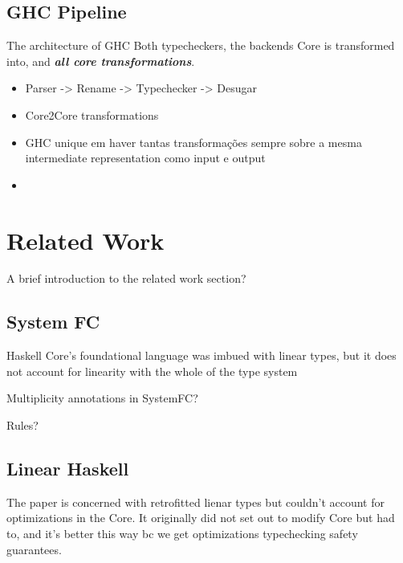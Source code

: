 \documentclass[]{lwnovathesis}
\begin{document}
\section{GHC Pipeline}

The architecture of GHC
Both typecheckers, the backends Core is transformed into, and \textbf{\emph{all
core transformations}}.

\begin{itemize}
    \item Parser -> Rename -> Typechecker -> Desugar
    \item Core2Core transformations
    \item GHC unique em haver tantas transformações sempre sobre a mesma intermediate
        representation como input e output
    \item 
\end{itemize}


\chapter{Related Work}

A brief introduction to the related work section?

\section{System FC}

Haskell Core's foundational language was imbued with linear types, but it does
not account for linearity with the whole of the type system

Multiplicity annotations in SystemFC?

Rules?

\section{Linear Haskell}

The paper is concerned with retrofitted lienar types but couldn't account for
optimizations in the Core. It originally did not set out to modify Core but had
to, and it's better this way bc we get optimizations typechecking safety
guarantees.
\end{document}
